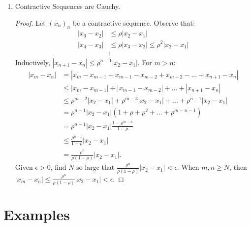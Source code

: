 \begin{enumerate}[label = (\arabic*)]
        \item Contractive Sequences are Cauchy.
            {\color{red} \begin{proof}
                Let $(x_n)_n$ be a contractive sequence. Observe that:
                    \begin{equation*}
                    \begin{split}
                        |x_3 - x_2| &\leq \rho|x_2 - x_1| \\
                        |x_4 - x_3| &\leq \rho|x_3 - x_2| \leq \rho^2|x_2 - x_1| \\
                        &\vdots
                    \end{split}
                    \end{equation*}
                Inductively, $|x_{n+1} - x_n| \leq \rho^{n-1}|x_2 - x_1|$. For $m > n$:
                    \begin{equation*}
                    \begin{split}
                        |x_m - x_n| &= |x_m - x_{m-1} + x_{m-1} - x_{m-2} + x_{m-2} - ... + x_{n+1} - x_n| \\
                        & \leq |x_m - x_{m-1}| + |x_{m-1} - x_{m-2}| + ... + |x_{n+1} - x_n| \\
                        & \leq \rho^{m-2}|x_2 - x_1| + \rho^{m-3}|x_2 - x_1| + ... + \rho^{n-1}|x_2 - x_1| \\
                        & = \rho^{n-1}|x_2 - x_1|(1 + \rho + \rho^2 + ... + \rho^{m-n-1}) \\
                        & = \rho^{n-1}|x_2 - x_1| \frac{1 - \rho^{m-n}}{1-\rho} \\
                        & \leq \frac{\rho^{n-1}}{1 - \rho}|x_2 - x_1| \\
                        & = \frac{\rho^n}{\rho(1-\rho)}|x_2 - x_1|.
                    \end{split}
                    \end{equation*}
                Given $\epsilon > 0$, find $N$ so large that $\frac{\rho^n}{\rho(1-\rho)}|x_2 - x_1| < \epsilon$. When $m,n \geq N$, then $|x_m - x_n| \leq \frac{\rho^n}{\rho(1-\rho)}|x_2 - x_1| < \epsilon$.
            \end{proof}}
    \end{enumerate}
\section*{Examples}
